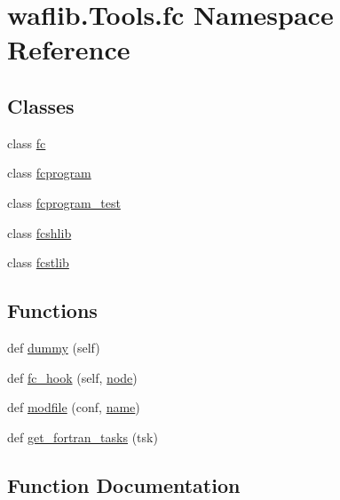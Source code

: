 \hypertarget{namespacewaflib_1_1_tools_1_1fc}{}\section{waflib.\+Tools.\+fc Namespace Reference}
\label{namespacewaflib_1_1_tools_1_1fc}
\subsection*{Classes}
\begin{DoxyCompactItemize}
\item 
class \hyperlink{classwaflib_1_1_tools_1_1fc_1_1fc}{fc}
\item 
class \hyperlink{classwaflib_1_1_tools_1_1fc_1_1fcprogram}{fcprogram}
\item 
class \hyperlink{classwaflib_1_1_tools_1_1fc_1_1fcprogram__test}{fcprogram\+\_\+test}
\item 
class \hyperlink{classwaflib_1_1_tools_1_1fc_1_1fcshlib}{fcshlib}
\item 
class \hyperlink{classwaflib_1_1_tools_1_1fc_1_1fcstlib}{fcstlib}
\end{DoxyCompactItemize}
\subsection*{Functions}
\begin{DoxyCompactItemize}
\item 
def \hyperlink{namespacewaflib_1_1_tools_1_1fc_a27d355b521fb9e2bf9fa51b4c5b86a75}{dummy} (self)
\item 
def \hyperlink{namespacewaflib_1_1_tools_1_1fc_a32c4c535596617f7d93fadd0607f18eb}{fc\+\_\+hook} (self, \hyperlink{structnode}{node})
\item 
def \hyperlink{namespacewaflib_1_1_tools_1_1fc_ae8fd3a39f47bdf4cb2e5d16cbdacd4e0}{modfile} (conf, \hyperlink{lib_2expat_8h_a1b49b495b59f9e73205b69ad1a2965b0}{name})
\item 
def \hyperlink{namespacewaflib_1_1_tools_1_1fc_a042f42940a7e5040b3d6e9c3dd3df7f4}{get\+\_\+fortran\+\_\+tasks} (tsk)
\end{DoxyCompactItemize}


\subsection{Function Documentation}
